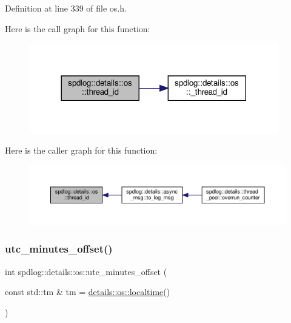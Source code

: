 Definition at line 339 of file os.\+h.

Here is the call graph for this function\+:
\nopagebreak
\begin{figure}[H]
\begin{center}
\leavevmode
\includegraphics[width=308pt]{namespacespdlog_1_1details_1_1os_ad0fc3a9bd510324d2d5f31acb3607e90_cgraph}
\end{center}
\end{figure}
Here is the caller graph for this function\+:
\nopagebreak
\begin{figure}[H]
\begin{center}
\leavevmode
\includegraphics[width=350pt]{namespacespdlog_1_1details_1_1os_ad0fc3a9bd510324d2d5f31acb3607e90_icgraph}
\end{center}
\end{figure}
\mbox{\label{namespacespdlog_1_1details_1_1os_a6dce662c3a4ea0b6e95468272ec37047}} 
\subsubsection{\texorpdfstring{utc\+\_\+minutes\+\_\+offset()}{utc\_minutes\_offset()}}
{\footnotesize\ttfamily int spdlog\+::details\+::os\+::utc\+\_\+minutes\+\_\+offset (\begin{DoxyParamCaption}\item[{const std\+::tm \&}]{tm = {\ttfamily \hyperlink{namespacespdlog_1_1details_1_1os_aef63b92ee93ec66603c0357d0ac75bed}{details\+::os\+::localtime}()} }\end{DoxyParamCaption})\hspace{0.3cm}{\ttfamily [inline]}}



